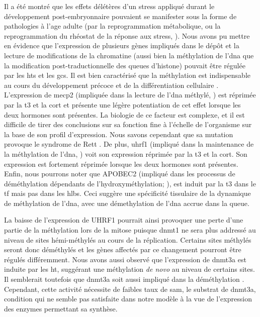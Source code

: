 \documentclass[../main.tex]{subfiles}
\begin{document}
	Il a été montré que les effets délétères d'un stress appliqué durant le développement post-embryonnaire pouvaient se manifester sous la forme de pathologies à l'age adulte (par la reprogrammation métabolique, \citealp{Drake2012,Begum2013} ou la reprogrammation du rhéostat de la réponse aux stress, \citealp{Weaver2004}).
	Nous avons pu mettre en évidence que l'expression de plusieurs gènes impliqués dans le dépôt et la lecture de modifications de la chromatine (aussi bien la méthylation de l'\gls{dna} que la modification post-traductionnelle des queues d'histone) pouvait être régulée par les \glspl{ht} et les \glspl{gc}.
	Il est bien caractérisé que la méthylation est indispensable au cours du développement précoce et de la différentiation cellulaire \citep{Monk1987,Meissner2008}.
	L'expression de \gls{mecp2} (impliquée dans la lecture de l'\gls{dna} méthylé, \citealp{Zou2012}) est réprimée par la \gls{t3} et la \gls{cort} et présente une légère potentiation de cet effet lorsque les deux hormones sont présentes.
	La biologie de ce facteur est complexe, et il est difficile de tirer des conclusions sur sa fonction fine à l’échelle de l'organisme sur la base de son profil d'expression.
	Nous savons cependant que sa mutation provoque le syndrome de Rett \citep{Amir1999}.
	De plus, \gls{uhrf1} (impliqué dans la maintenance de la méthylation de l'\gls{dna}, \citealp{Bostick2007,Liu2013a}) voit son expression réprimée par la \gls{t3} et la \gls{cort}.
	Son expression est fortement réprimée lorsque les deux hormones sont présentes.
	Enfin, nous pourrons noter que APOBEC2 (impliqué dans les processus de déméthylation dépendants de l'hydroxyméthylation; \citealp{Guo2011}), est induit par la \gls{t3} dans le \gls{tf} mais pas dans les \glspl{hlb}.
	Ceci suggère une spécificité tissulaire de la dynamique de méthylation de l'\gls{dna}, avec une démethylation de l'\gls{dna} accrue dans la queue.
	\par
	La baisse de l'expression de UHRF1 pourrait ainsi provoquer une perte d'une partie de la méthylation lors de la mitose puisque \gls{dnmt1} ne sera plus addressé au niveau de sites hémi-méthylés au cours de la réplication.
	Certains sites méthylés seront donc déméthylés et les gènes affectés par ce changement pourront être régulés différemment.
	Nous avons aussi observé que l'expression de \gls{dnmt3a} est induite par les \gls{ht}, suggérant une méthylation \textit{de novo} au niveau de certains sites.
	Il semblerait toutefois que \gls{dnmt3a} soit aussi impliqué dans la déméthylation \citep{Wu2010}.
	Cependant, cette activité nécessite de faibles taux de \gls{sam}, le substrat de \gls{dnmt3a}, condition qui ne semble pas satisfaite dans notre modèle à la vue de l'expression des enzymes permettant sa synthèse.
\end{document}
